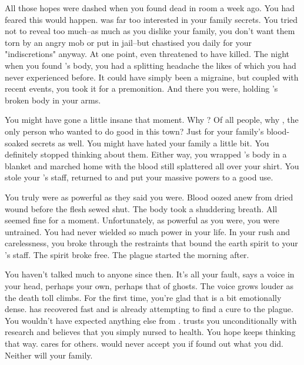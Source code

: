 \documentclass[char]{guildcamp4}
\begin{document}
All those hopes were dashed when you found \cOutsider{} dead in \cOutsider{\their} room a week ago. You had feared this would happen. \cOutsider{} was far too interested in your family secrets. You tried not to reveal too much--as much as you dislike your family, you don't want them torn by an angry mob or put in jail--but \cApprentice{} chastised you daily for your "indiscretions" anyway. At one point, \cApprentice{\they} even threatened to have \cOutsider{} killed. The night when you found \cOutsider{}'s body, you had a splitting headache the likes of which you had never experienced before. It could have simply been a migraine, but coupled with recent events, you took it for a premonition. And there you were, holding \cOutsider{}'s broken body in your arms.

You might have gone a little insane that moment. Why \cOutsider{\them}? Of all people, why \cOutsider{}, the only person who wanted to do good in this town? Just for your family's blood-soaked secrets as well. You might have hated your family a little bit. You definitely stopped thinking about them. Either way, you wrapped \cOutsider{}'s body in a blanket and marched home with the blood still splattered all over your shirt. You stole your \cElder{\parent}'s staff, returned to \cOutsider{} and put your massive powers to a good use.

You truly were as powerful as they said you were. Blood oozed anew from dried wound before the flesh sewed shut. The body took a shuddering breath. All seemed fine for a moment. Unfortunately, as powerful as you were, you were untrained. You had never wielded so much power in your life. In your rush and carelessness, you broke through the restraints that bound the earth spirit to your \cElder{\parent}'s staff. The spirit broke free. The plague started the morning after.

You haven't talked much to anyone since then. It's all your fault, says a voice in your head, perhaps your own, perhaps that of ghosts. The voice grows louder as the death toll climbs. For the first time, you're glad that \cOutsider{} is a bit emotionally dense. \cOutsider{\They} has recovered fast and is already attempting to find a cure to the plague. You wouldn't have expected anything else from \cOutsider{\them}. \cOutsider{\They} trusts you unconditionally with \cOutsider{\their} research and believes that you simply nursed \cOutsider{\them} to health. You hope \cOutsider{\they} keeps thinking that way. \cOutsider{} cares for others. \cOutsider{\They} would never accept you if \cOutsider{\they} found out what you did. Neither will your family.
\end{document}

